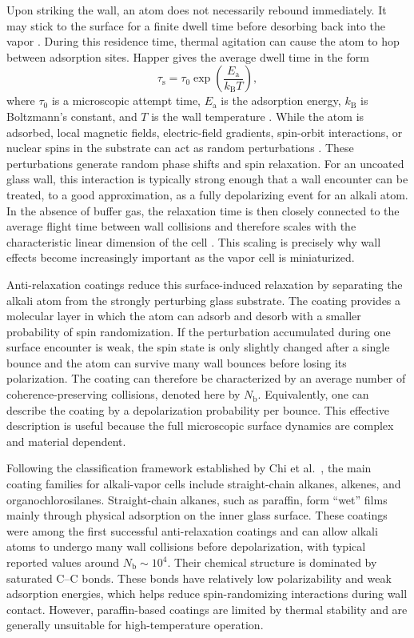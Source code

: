 Upon striking the wall, an atom does not necessarily rebound immediately. It may stick to the surface for a finite dwell time before desorbing back into the vapor \cite{OP_Happer_1972,Aiacoavc_ChiEtAl_2020}. During this residence time, thermal agitation can cause the atom to hop between adsorption sites. Happer gives the average dwell time in the form
\begin{equation}
    \tau_{\mathrm{s}}
    =
    \tau_0
    \exp\!\left(\frac{E_{\mathrm{a}}}{k_{\mathrm{B}}T}\right),
    \label{eq:dwell_time}
\end{equation}
where \(\tau_0\) is a microscopic attempt time, \(E_{\mathrm{a}}\) is the adsorption energy, \(k_{\mathrm{B}}\) is Boltzmann's constant, and \(T\) is the wall temperature \cite{OP_Happer_1972}. While the atom is adsorbed, local magnetic fields, electric-field gradients, spin-orbit interactions, or nuclear spins in the substrate can act as random perturbations \cite{OP_Happer_1972}. These perturbations generate random phase shifts and spin relaxation. For an uncoated glass wall, this interaction is typically strong enough that a wall encounter can be treated, to a good approximation, as a fully depolarizing event for an alkali atom. In the absence of buffer gas, the relaxation time is then closely connected to the average flight time between wall collisions and therefore scales with the characteristic linear dimension of the cell \cite{OP_Happer_1972}. This scaling is precisely why wall effects become increasingly important as the vapor cell is miniaturized.

Anti-relaxation coatings reduce this surface-induced relaxation by separating the alkali atom from the strongly perturbing glass substrate. The coating provides a molecular layer in which the atom can adsorb and desorb with a smaller probability of spin randomization. If the perturbation accumulated during one surface encounter is weak, the spin state is only slightly changed after a single bounce and the atom can survive many wall bounces before losing its polarization. The coating can therefore be characterized by an average number of coherence-preserving collisions, denoted here by \(N_{\text{b}}\). Equivalently, one can describe the coating by a depolarization probability per bounce. This effective description is useful because the full microscopic surface dynamics are complex and material dependent.

Following the classification framework established by Chi et al.~\cite{Aiacoavc_ChiEtAl_2020}, the main coating families for alkali-vapor cells include straight-chain alkanes, alkenes, and organochlorosilanes. Straight-chain alkanes, such as paraffin, form ``wet'' films mainly through physical adsorption on the inner glass surface. These coatings were among the first successful anti-relaxation coatings and can allow alkali atoms to undergo many wall collisions before depolarization, with typical reported values around \(N_{\text{b}}\sim 10^4\). Their chemical structure is dominated by saturated C--C bonds. These bonds have relatively low polarizability and weak adsorption energies, which helps reduce spin-randomizing interactions during wall contact. However, paraffin-based coatings are limited by thermal stability and are generally unsuitable for high-temperature operation.

